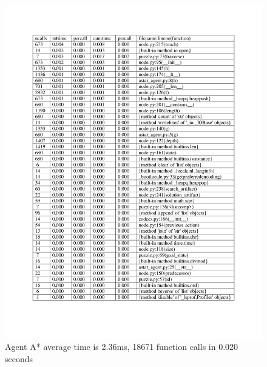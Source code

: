 \begin{figure}[H]
\includegraphics[width=1\linewidth]{assets/Assignment 1 profiling a asterisk.pdf}
\caption{Agent A* average time is 2.36ms, 18671 function calls in 0.020 seconds} \label{a asterisk profiling}
\end{figure}

